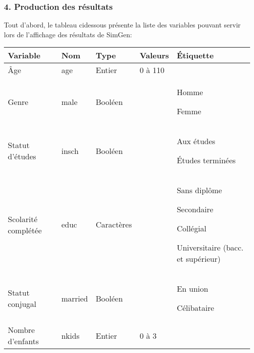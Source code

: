 \documentclass[letterpaper,10pt,french]{sphinxmanual}
\begin{document}
\begin{DUlineblock}{0em}
\item[] 
\end{DUlineblock}


\subsubsection{4. Production des résultats}
\label{\detokenize{utilisation:production-des-resultats}}
Tout d’abord, le tableau ci\sphinxhyphen{}dessous présente la liste des variables pouvant servir lors de l’affichage des résultats de SimGen:


\begin{savenotes}\sphinxattablestart
\centering
\begin{tabulary}{\linewidth}[t]{|T|T|T|T|T|}
\hline
\sphinxstyletheadfamily 
Variable
&\sphinxstyletheadfamily 
Nom
&\sphinxstyletheadfamily 
Type
&\sphinxstyletheadfamily 
Valeurs
&\sphinxstyletheadfamily 
Étiquette
\\
\hline
Âge
&
age
&
Entier
&
0 à 110
&\\
\hline
Genre
&
male
&
Booléen
&

&
Homme

Femme
\\
\hline
Statut d’études
&
insch
&
Booléen
&

&
Aux études

Études terminées
\\
\hline
Scolarité complétée
&
educ
&
Caractères
&



&
Sans diplôme

Secondaire

Collégial

Universitaire (bacc. et supérieur)
\\
\hline
Statut conjugal
&
married
&
Booléen
&

&
En union

Célibataire
\\
\hline
Nombre d’enfants
&
nkids
&
Entier
&
0 à 3
&\\
\hline
\end{tabulary}
\par
\sphinxattableend\end{savenotes}
\end{document}
